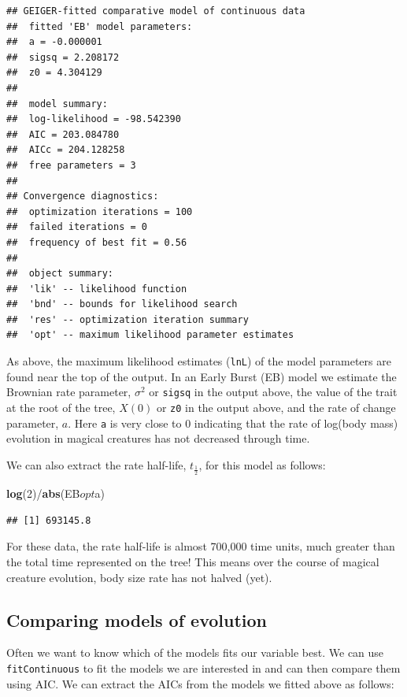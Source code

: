 \documentclass[]{book}
\newenvironment{Shaded}{\begin{snugshade}}{\end{snugshade}}
\newcommand{\KeywordTok}[1]{\textcolor[rgb]{0.13,0.29,0.53}{\textbf{{#1}}}}
\newcommand{\DecValTok}[1]{\textcolor[rgb]{0.00,0.00,0.81}{{#1}}}
\newcommand{\NormalTok}[1]{{#1}}
\theoremstyle{definition}
\theoremstyle{definition}
\theoremstyle{definition}
\theoremstyle{remark}
\begin{document}
\begin{verbatim}
## GEIGER-fitted comparative model of continuous data
##  fitted 'EB' model parameters:
##  a = -0.000001
##  sigsq = 2.208172
##  z0 = 4.304129
## 
##  model summary:
##  log-likelihood = -98.542390
##  AIC = 203.084780
##  AICc = 204.128258
##  free parameters = 3
## 
## Convergence diagnostics:
##  optimization iterations = 100
##  failed iterations = 0
##  frequency of best fit = 0.56
## 
##  object summary:
##  'lik' -- likelihood function
##  'bnd' -- bounds for likelihood search
##  'res' -- optimization iteration summary
##  'opt' -- maximum likelihood parameter estimates
\end{verbatim}

As above, the maximum likelihood estimates (\texttt{lnL}) of the model
parameters are found near the top of the output. In an Early Burst (EB)
model we estimate the Brownian rate parameter, \(\sigma^2\) or
\texttt{sigsq} in the output above, the value of the trait at the root
of the tree, \(X(0)\) or \texttt{z0} in the output above, and the rate
of change parameter, \(a\). Here \texttt{a} is very close to 0
indicating that the rate of log(body mass) evolution in magical
creatures has not decreased through time.

We can also extract the rate half-life, \(t_{\frac{1}{2}}\), for this
model as follows:

\begin{Shaded}
\begin{Highlighting}[]
\KeywordTok{log}\NormalTok{(}\DecValTok{2}\NormalTok{)/}\KeywordTok{abs}\NormalTok{(EB$opt$a)}
\end{Highlighting}
\end{Shaded}

\begin{verbatim}
## [1] 693145.8
\end{verbatim}

For these data, the rate half-life is almost 700,000 time units, much
greater than the total time represented on the tree! This means over the
course of magical creature evolution, body size rate has not halved
(yet).

\subsection{Comparing models of
evolution}\label{comparing-models-of-evolution}

Often we want to know which of the models fits our variable best. We can
use \texttt{fitContinuous} to fit the models we are interested in and
can then compare them using AIC. We can extract the AICs from the models
we fitted above as follows:
\end{document}
